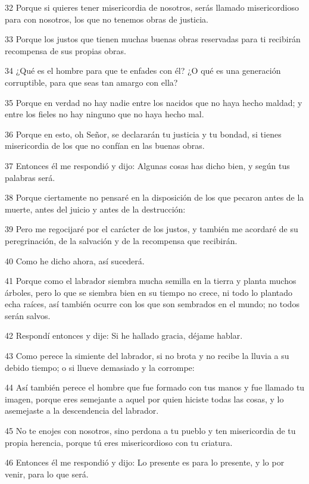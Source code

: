 \par 32 Porque si quieres tener misericordia de nosotros, serás llamado misericordioso para con nosotros, los que no tenemos obras de justicia.
\par 33 Porque los justos que tienen muchas buenas obras reservadas para ti recibirán recompensa de sus propias obras.
\par 34 ¿Qué es el hombre para que te enfades con él? ¿O qué es una generación corruptible, para que seas tan amargo con ella?
\par 35 Porque en verdad no hay nadie entre los nacidos que no haya hecho maldad; y entre los fieles no hay ninguno que no haya hecho mal.
\par 36 Porque en esto, oh Señor, se declararán tu justicia y tu bondad, si tienes misericordia de los que no confían en las buenas obras.
\par 37 Entonces él me respondió y dijo: Algunas cosas has dicho bien, y según tus palabras será.
\par 38 Porque ciertamente no pensaré en la disposición de los que pecaron antes de la muerte, antes del juicio y antes de la destrucción:
\par 39 Pero me regocijaré por el carácter de los justos, y también me acordaré de su peregrinación, de la salvación y de la recompensa que recibirán.
\par 40 Como he dicho ahora, así sucederá.
\par 41 Porque como el labrador siembra mucha semilla en la tierra y planta muchos árboles, pero lo que se siembra bien en su tiempo no crece, ni todo lo plantado echa raíces, así también ocurre con los que son sembrados en el mundo; no todos serán salvos.
\par 42 Respondí entonces y dije: Si he hallado gracia, déjame hablar.
\par 43 Como perece la simiente del labrador, si no brota y no recibe la lluvia a su debido tiempo; o si llueve demasiado y la corrompe:
\par 44 Así también perece el hombre que fue formado con tus manos y fue llamado tu imagen, porque eres semejante a aquel por quien hiciste todas las cosas, y lo asemejaste a la descendencia del labrador.
\par 45 No te enojes con nosotros, sino perdona a tu pueblo y ten misericordia de tu propia herencia, porque tú eres misericordioso con tu criatura.
\par 46 Entonces él me respondió y dijo: Lo presente es para lo presente, y lo por venir, para lo que será.

